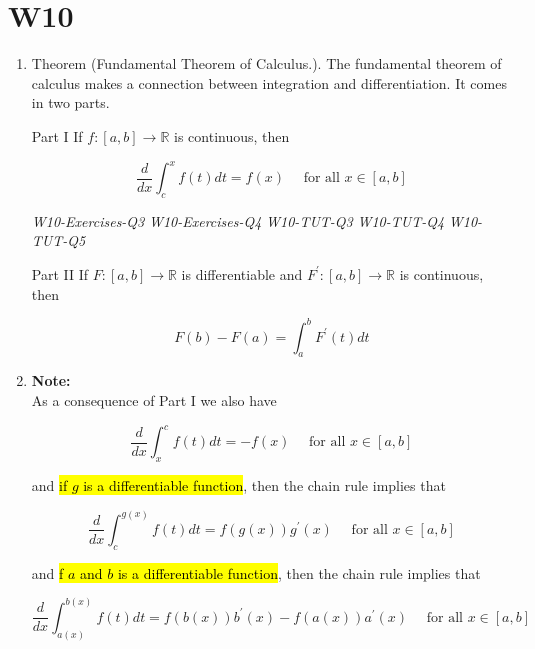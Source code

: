 \documentclass[10pt]{article}
\begin{document}
\newpage



\section{W10}

\begin{enumerate}

\item Theorem (Fundamental Theorem of Calculus.). The fundamental theorem of calculus makes a connection between integration and differentiation. It comes in two parts.

Part I If $f:[a, b] \rightarrow \mathbb{R}$ is continuous, then

$$
\frac{d}{d x} \int_{c}^{x} f(t) d t=f(x) \quad \text { for all } x \in[a, b]
$$

\textit{W10-Exercises-Q3}
\textit{W10-Exercises-Q4}
\textit{W10-TUT-Q3}
\textit{W10-TUT-Q4}
\textit{W10-TUT-Q5}


Part II If $F:[a, b] \rightarrow \mathbb{R}$ is differentiable and $F^{\prime}:[a, b] \rightarrow \mathbb{R}$ is continuous, then

$$
F(b)-F(a)=\int_{a}^{b} F^{\prime}(t) d t
$$

\item \textbf{Note:}\\
As a consequence of Part I we also have

$$
\frac{d}{d x} \int_{x}^{c} f(t) d t=-f(x) \quad \text { for all } x \in[a, b]
$$

and \hl{if $g$ is a differentiable function}, then the chain rule implies that

$$
\frac{d}{d x} \int_{c}^{g(x)} f(t) d t=f(g(x)) g^{\prime}(x) \quad \text { for all } x \in[a, b]
$$

and \hl{f $a$ and $b$ is a differentiable function}, then the chain rule implies that

$$
\frac{d}{d x} \int_{a(x)}^{b(x)} f(t) d t=f(b(x)) b^{\prime}(x) - f(a(x)) a^{\prime}(x)\quad \text { for all } x \in[a, b]
$$

\end{enumerate}


\newpage
\end{document}
